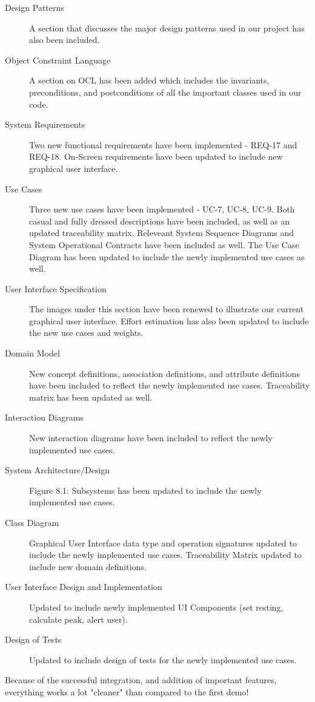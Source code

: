 \documentclass[letterpaper,english, 12pt]{scrreprt}
\begin{document}
\begin{description}
	\item[Design Patterns] A section that discusses the major design patterns used in our project has also been included.
	\item[Object Constraint Language] A section on OCL has been added which includes the invariants, preconditions, and postconditions of all the important classes used in our code.
	\item[System Requirements] Two new functional requirements have been implemented - REQ-17 and REQ-18. On-Screen requirements have been updated to include new graphical user interface.
	\item[Use Cases] Three new use cases have been implemented - UC-7, UC-8, UC-9. Both casual and fully dressed descriptions have been included, as well as an updated traceability matrix. Releveant System Sequence Diagrams and System Operational Contracts have been included as well. The Use Case Diagram has been updated to include the newly implemented use cases as well.
	\item[User Interface Specification] The images under this section have been renewed to illustrate our current graphical user interface. Effort estimation has also been updated to include the new use cases and weights.
	\item[Domain Model] New concept definitions, association definitions, and attribute definitions have been included to reflect the newly implemented use cases. Traceability matrix has been updated as well.
	\item[Interaction Diagrams] New interaction diagrams have been included to reflect the newly implemented use cases.
	\item[System Architecture/Design] Figure 8.1: Subsystems has been updated to include the newly implemented use cases.
	\item[Class Diagram] Graphical User Interface data type and operation signatures updated to include the newly implemented use cases. Traceability Matrix updated to include new domain definitions.
	\item[User Interface Design and Implementation] Updated to include newly implemented UI Components (set resting, calculate peak, alert user).
	\item[Design of Tests] Updated to include design of tests for the newly implemented use cases.
\end{description}
Because of the successful integration, and addition of important features, everything works a lot "cleaner" than compared to the first demo!
\end{document}
